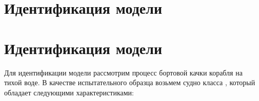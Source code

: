 \section{Идентификация модели}

%
%
%
%
%


\section{Идентификация модели}

Для идентификации модели рассмотрим процесс бортовой качки корабля на тихой воде.
В качестве испытательного образца возьмем судно класса , который обладает следующими характеристиками:

